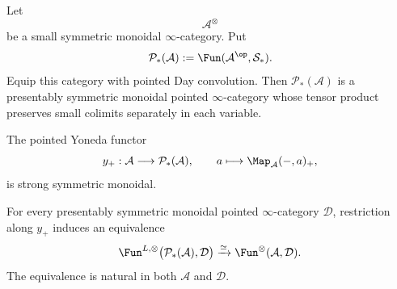 \begin{lemma}
\label{lem:free-pointed-monoidal-completion}
Let
\[
    \mathcal A^\otimes
\]
be a small symmetric monoidal \(\infty\)-category.  Put
\[
    \mathcal P_*(\mathcal A)
    :=
    \Fun(\mathcal A^{\op},\mathcal S_*).
\]
Equip this category with pointed Day convolution.  Then
\(\mathcal P_*(\mathcal A)\) is a presentably symmetric monoidal pointed
\(\infty\)-category whose tensor product preserves small colimits separately
in each variable.

The pointed Yoneda functor
\[
    y_+:
    \mathcal A
    \longrightarrow
    \mathcal P_*(\mathcal A),
    \qquad
    a\longmapsto
    \Map_{\mathcal A}(-,a)_+,
\]
is strong symmetric monoidal.

For every presentably symmetric monoidal pointed \(\infty\)-category
\(\mathcal D\), restriction along \(y_+\) induces an equivalence
\[
    \Fun^{L,\otimes}
    \bigl(
      \mathcal P_*(\mathcal A),
      \mathcal D
    \bigr)
    \xrightarrow{\simeq}
    \Fun^\otimes(\mathcal A,\mathcal D).
\]
The equivalence is natural in both \(\mathcal A\) and \(\mathcal D\).
\end{lemma}

